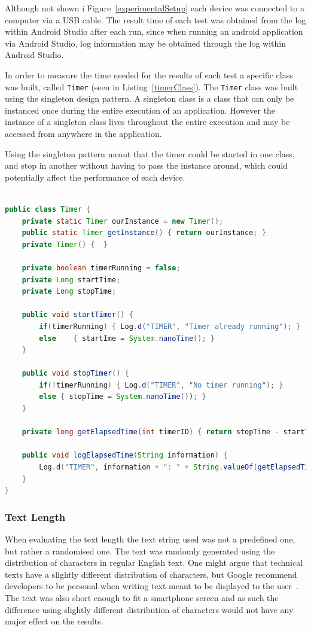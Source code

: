 Although not shown i Figure~\ref{experimentalSetup} each device was connected to a computer via a USB cable. The result time of each test was obtained from the log within Android Studio after each run, since when running an android application via Android Studio, log information may be obtained through the log within Android Studio.

In order to measure the time needed for the results of each test a specific class was built, called \texttt{Timer} (seen in Listing~\ref{timerClass}). The \texttt{Timer} class was built using the singleton design pattern. A singleton class is a class that can only be instanced once during the entire execution of an application. However the instance of a singleton class lives throughout the entire execution and may be accessed from anywhere in the application.

Using the singleton pattern meant that the timer could be started in one class, and stop in another without having to pass the instance around, which could potentially affect the performance of each device.

\begin{lstlisting}[language=Java, caption={The Timer class}, label=timerClass]

public class Timer {
	private static Timer ourInstance = new Timer();
	public static Timer getInstance() { return ourInstance; }
	private Timer() {  }
	
	private boolean timerRunning = false;
	private Long startTime;
	private Long stopTime;
	
	public void startTimer() { 
		if(timerRunning) { Log.d("TIMER", "Timer already running"); }
		else 	{ startIme = System.nanoTime(); }
	}
	
	public void stopTimer() {
		if(!timerRunning) { Log.d("TIMER", "No timer running"); }
		else { stopTime = System.nanoTime()); }
	}
	
	private long getElapsedTime(int timerID) { return stopTime - startTime; }
	
	public void logElapsedTime(String information) {
		Log.d("TIMER", information + ": " + String.valueOf(getElapsedTime() + " nano seconds");
	}
}
\end{lstlisting}

\subsubsection{Text Length}
When evaluating the text length the text string used was not a predefined one, but rather a randomised one. The text was randomly generated using the distribution of characters in regular English text. One might argue that technical texts have a slightly different distribution of characters, but Google recommend developers to be personal when writing text meant to be displayed to the user~\cite{glassDesignStyle}. The text was also short enough to fit a smartphone screen and as such the difference using slightly different distribution of characters would not have any major effect on the results.

